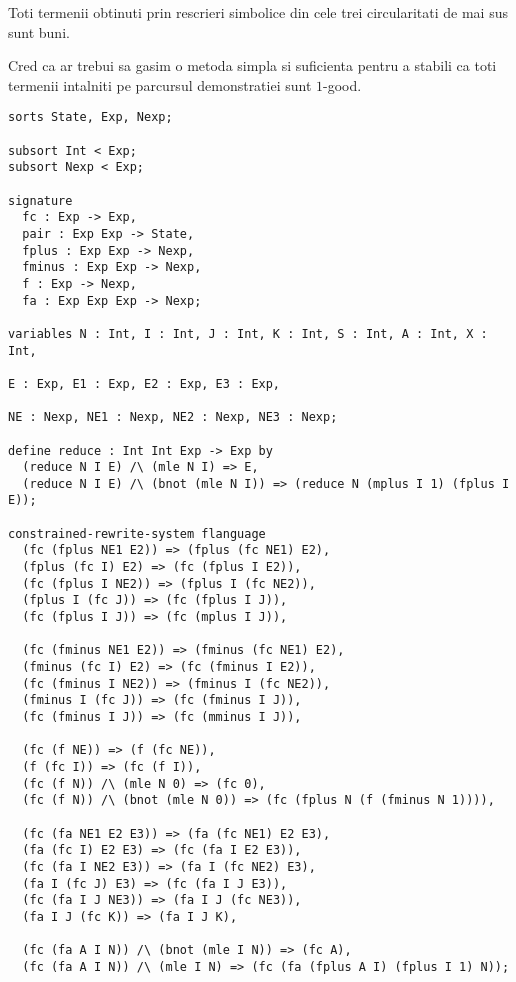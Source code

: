 \documentclass[10pt,a5paper]{article}
\begin{document}
\begin{conjecture}[Conjectura 1]

  Toti termenii obtinuti prin rescrieri simbolice din cele trei
  circularitati de mai sus sunt buni.
  
\end{conjecture}

Cred ca ar trebui sa gasim o metoda simpla si suficienta pentru a
stabili ca toti termenii intalniti pe parcursul demonstratiei sunt
$1$-good.

\begin{verbatim}
sorts State, Exp, Nexp;

subsort Int < Exp;
subsort Nexp < Exp;

signature
  fc : Exp -> Exp,
  pair : Exp Exp -> State,
  fplus : Exp Exp -> Nexp,
  fminus : Exp Exp -> Nexp,
  f : Exp -> Nexp,
  fa : Exp Exp Exp -> Nexp;

variables N : Int, I : Int, J : Int, K : Int, S : Int, A : Int, X : Int,

E : Exp, E1 : Exp, E2 : Exp, E3 : Exp,

NE : Nexp, NE1 : Nexp, NE2 : Nexp, NE3 : Nexp;

define reduce : Int Int Exp -> Exp by
  (reduce N I E) /\ (mle N I) => E,
  (reduce N I E) /\ (bnot (mle N I)) => (reduce N (mplus I 1) (fplus I E));

constrained-rewrite-system flanguage
  (fc (fplus NE1 E2)) => (fplus (fc NE1) E2),
  (fplus (fc I) E2) => (fc (fplus I E2)),
  (fc (fplus I NE2)) => (fplus I (fc NE2)),
  (fplus I (fc J)) => (fc (fplus I J)),
  (fc (fplus I J)) => (fc (mplus I J)),

  (fc (fminus NE1 E2)) => (fminus (fc NE1) E2),
  (fminus (fc I) E2) => (fc (fminus I E2)),
  (fc (fminus I NE2)) => (fminus I (fc NE2)),
  (fminus I (fc J)) => (fc (fminus I J)),
  (fc (fminus I J)) => (fc (mminus I J)),

  (fc (f NE)) => (f (fc NE)),
  (f (fc I)) => (fc (f I)),
  (fc (f N)) /\ (mle N 0) => (fc 0),
  (fc (f N)) /\ (bnot (mle N 0)) => (fc (fplus N (f (fminus N 1)))),

  (fc (fa NE1 E2 E3)) => (fa (fc NE1) E2 E3),
  (fa (fc I) E2 E3) => (fc (fa I E2 E3)),
  (fc (fa I NE2 E3)) => (fa I (fc NE2) E3),
  (fa I (fc J) E3) => (fc (fa I J E3)),
  (fc (fa I J NE3)) => (fa I J (fc NE3)),
  (fa I J (fc K)) => (fa I J K),

  (fc (fa A I N)) /\ (bnot (mle I N)) => (fc A),
  (fc (fa A I N)) /\ (mle I N) => (fc (fa (fplus A I) (fplus I 1) N));


\end{verbatim}
\end{document}
